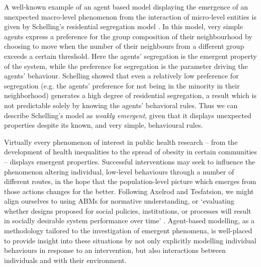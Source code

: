 \documentclass[review]{elsarticle}
\begin{document}
A well-known example of an agent based model displaying the emergence of an unexpected macro-level phenomenon from the interaction of micro-level entities is given by Schelling's residential segregation model \citep{schelling71, schelling78}. In this model, very simple agents express a preference for the group composition of their neighbourhood by choosing to move when the number of their neighbours from a different group exceeds a certain threshold.  Here the agents' segregation is the emergent property of the system, while the preference for segregation is the parameter driving the agents' behaviour. Schelling showed that even a relatively low preference for segregation (e.g. the agents' preference for not being in the minority in their neighborhood) generates a high degree of residential segregation, a result which is not predictable solely by knowing the agents' behavioral rules.  Thus we can describe Schelling's model as \emph{weakly emergent}, given that it displays unexpected properties despite its known, and very simple, behavioural rules.

Virtually every phenomenon of interest in public health research -- from the development of health inequalities to the spread of obesity in certain communities -- displays emergent properties. Successful interventions may seek to influence the phenomenon altering individual, low-level behaviours through a number of different routes, in the hope that the population-level picture which emerges from those actions changes for the better. Following Axelrod and Tesfatsion, we might align ourselves to using ABMs for normative understanding, or `evaluating whether designs proposed for social policies, institutions, or processes will result in socially desirable system performance over time' \citep{axelrod05}. 
Agent-based modelling, as a methodology tailored to the investigation of emergent phenomena, is well-placed to provide insight into these situations by not only explicitly modelling individual behaviours in response to an intervention, but also interactions between individuals and with their environment.
\end{document}
